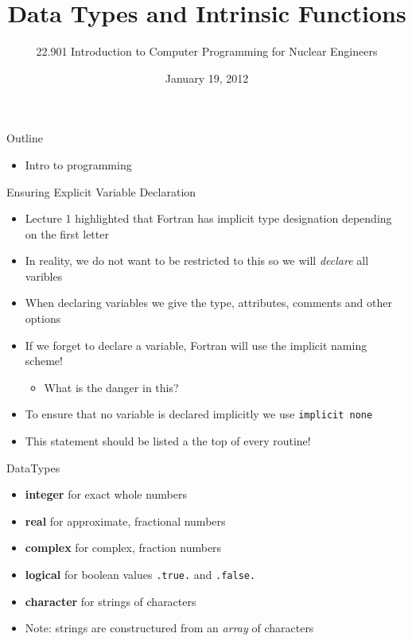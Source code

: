 \documentclass{beamer}
\title[Data Types and Intrinsic Functions]{Data Types and Intrinsic Functions}
\author[]{22.901 Introduction to Computer Programming for Nuclear Engineers}
\institute[\insertpagenumber]{}
\date{January 19, 2012}
\begin{document}

\frame{\titlepage}

\begin{frame}{Outline}
  \begin{itemize}
   \item Intro to programming
  \end{itemize}
\end{frame}
\begin{frame}{Ensuring Explicit Variable Declaration}

  \begin{itemize}
    
    \item Lecture 1 highlighted that Fortran has implicit type designation depending on the first letter
    \vfill\item In reality, we do not want to be restricted to this so we will \emph{declare} all varibles
    \vfill\item When declaring variables we give the type, attributes, comments and other options
    \vfill\item If we forget to declare a variable, Fortran will use the implicit naming scheme!
      \begin{itemize}
	\item What is the danger in this?
      \end{itemize}
    \vfill\item To ensure that no variable is declared implicitly we use \texttt{implicit none}
    \vfill\item This statement should be listed a the top of every routine!

  \end{itemize}

\end{frame}
\begin{frame}{DataTypes}

  \begin{itemize}
    \item \textbf{integer} for exact whole numbers
    \vfill\item \textbf{real} for approximate, fractional numbers
    \vfill\item \textbf{complex} for complex, fraction numbers
    \vfill\item \textbf{logical} for boolean values \texttt{.true.} and \texttt{.false.}
    \vfill\item \textbf{character} for strings of characters
    \vfill\item \alert{Note:} strings are constructured from an \emph{array} of characters 
  \end{itemize}

\end{frame}
\end{document}
